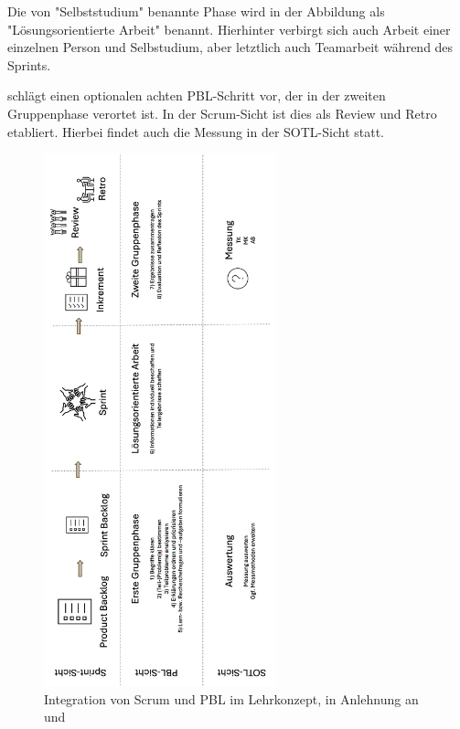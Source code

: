 \documentclass[a4paper,12pt]{article}
\begin{document}
Die von \cite{kenneweg2025problem} "Selbststudium" benannte Phase wird in der Abbildung als "Lösungsorientierte Arbeit" benannt. Hierhinter verbirgt sich auch Arbeit einer einzelnen Person und Selbstudium, aber letztlich auch Teamarbeit während des Sprints.

\cite{kenneweg2025problem} schlägt einen optionalen achten PBL-Schritt vor, der in der zweiten Gruppenphase verortet ist. In der Scrum-Sicht ist dies als Review und Retro etabliert. Hierbei findet auch die Messung in der SOTL-Sicht statt.


\begin{figure}[ht]
    \centering
    \includegraphics[width=0.6\textwidth]{images/scrumundpblundsotl.png}
    \caption{Integration von Scrum und PBL im Lehrkonzept, in Anlehnung an \cite{da2022scrum} und \cite{kenneweg2025problem}}
    \label{fig:scrum_pbl}
\end{figure}
\end{document}
